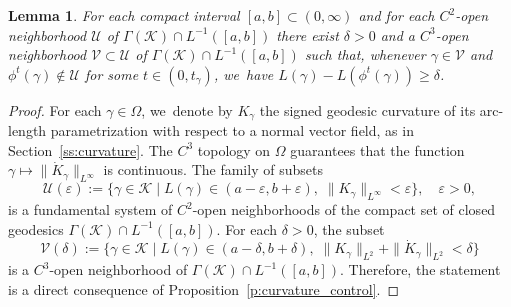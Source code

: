 \documentclass[JEP,XML,SOM,Unicode,NoFloatCountersInSection,published]{cedram}
\let\sep\mid
\let\epsilon\varepsilon
\newcommand{\KK}{\mathcal{K}}
\newcommand{\UU}{\mathcal{U}}
\newcommand{\VV}{\mathcal{V}}
\theoremstyle{plain}
\newtheorem{Lemma}[Thm]{Lemma}
\theoremstyle{definition}
\begin{document}
\begin{Lemma}\label{l:encapsulated_nbhds}
For each compact interval $[a,b]\subset(0,\infty)$ and for each $C^2$-open neighborhood $\UU$ of $\Gamma(\KK)\cap L^{-1}([a,b])$ there exist $\delta>0$ and a $C^3$-open neighborhood $\VV\subset\UU$ of $\Gamma(\KK)\cap L^{-1}([a,b])$ such that, whenever $\gamma\in\VV$ and $\phi^t(\gamma)\not\in\UU$ for some $t\in(0,t_\gamma)$, we~have $L(\gamma)-L(\phi^t(\gamma))\geq\delta$.
\end{Lemma}

\begin{proof}
For each $\gamma\in\Omega$, we~denote by $K_\gamma$ the signed geodesic curvature of its arc-length parametrization with respect to a normal vector field, as in Section~\ref{ss:curvature}.
The $C^3$ topology on $\Omega$ guarantees that the function $\gamma\mapsto\|\dot K_\gamma\|_{L^\infty}$ is continuous.
The family of subsets
\[
\UU(\epsilon):=\big\{ \gamma\in\KK\sep L(\gamma)\in(a-\epsilon,b+\epsilon),\; \|K_\gamma\|_{L^\infty}<\epsilon \big\},\quad \epsilon>0,
\]
is a fundamental system of $C^2$-open neighborhoods of the compact set of closed geodesics $\Gamma(\KK)\cap L^{-1}([a,b])$. For each $\delta>0$, the subset
\[
\VV(\delta):=\big\{ \gamma\in\KK\sep L(\gamma)\in(a-\delta,b+\delta),\; \|K_\gamma\|_{L^2}+\|\dot K_\gamma\|_{L^2}<\delta \big\}
\]
is a $C^3$-open neighborhood of $\Gamma(\KK)\cap L^{-1}([a,b])$. Therefore, the statement is a direct consequence of Proposition~\ref{p:curvature_control}.
\end{proof}
\end{document}

